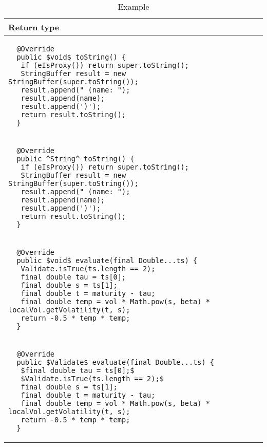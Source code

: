 \begin{table}[p]
\begin{tabular}{ | m{11cm} | }
  \hline
  Return type \\
  \hline
  \begin{lstlisting}
  @Override
  public $void$ toString() {
   if (eIsProxy()) return super.toString();
   StringBuffer result = new StringBuffer(super.toString());
   result.append(" (name: ");
   result.append(name);
   result.append(')');
   return result.toString();
  }
  \end{lstlisting} \\
  \begin{lstlisting}
  @Override
  public ^String^ toString() {
   if (eIsProxy()) return super.toString();
   StringBuffer result = new StringBuffer(super.toString());
   result.append(" (name: ");
   result.append(name);
   result.append(')');
   return result.toString();
  }
  \end{lstlisting} \\
  \hline
  \hline
  \begin{lstlisting}
  @Override
  public $void$ evaluate(final Double...ts) {
   Validate.isTrue(ts.length == 2);
   final double tau = ts[0];
   final double s = ts[1];
   final double t = maturity - tau;
   final double temp = vol * Math.pow(s, beta) * localVol.getVolatility(t, s);
   return -0.5 * temp * temp;
  }
  \end{lstlisting} \\
  \begin{lstlisting}
  @Override
  public $Validate$ evaluate(final Double...ts) {
   $final double tau = ts[0];$
   $Validate.isTrue(ts.length == 2);$
   final double s = ts[1];
   final double t = maturity - tau;
   final double temp = vol * Math.pow(s, beta) * localVol.getVolatility(t, s);
   return -0.5 * temp * temp;
  }
  \end{lstlisting} \\
  \hline
\end{tabular}
\caption{Example}
\label{return_type_showcase_table}
\end{table}

